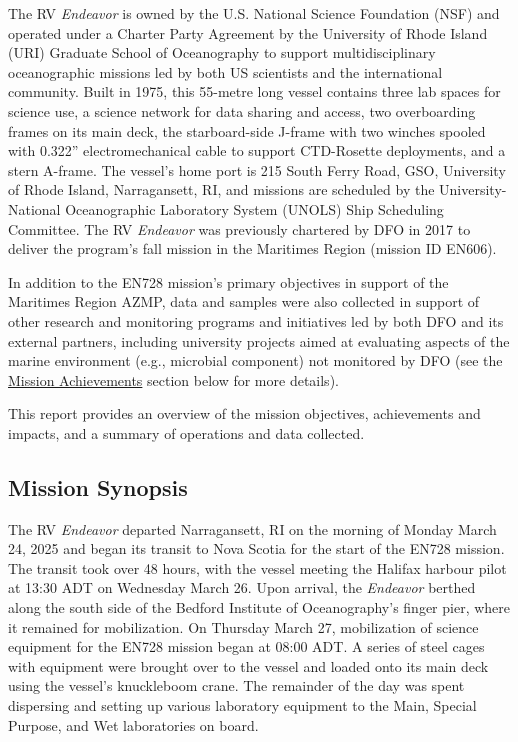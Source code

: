 \documentclass[12pt]{article}\usepackage[]{graphicx}\usepackage[]{color}
\begin{document}
The RV \emph{Endeavor} is owned by the U.S. National Science Foundation (NSF) and operated under a Charter Party Agreement by the University of Rhode Island (URI) Graduate School of Oceanography to support multidisciplinary oceanographic missions led by both US scientists and the international community. Built in 1975, this 55-metre long vessel contains three lab spaces for science use, a science network for data sharing and access, two overboarding frames on its main deck, the starboard-side J-frame with two winches spooled with 0.322'' electromechanical cable to support CTD-Rosette deployments, and a stern A-frame. The vessel's home port is 215 South Ferry Road, GSO, University of Rhode Island, Narragansett, RI, and missions are scheduled by the University-National Oceanographic Laboratory System (UNOLS) Ship Scheduling Committee. The RV \emph{Endeavor} was previously chartered by DFO in 2017 to deliver the program's fall mission in the Maritimes Region (mission ID EN606).

In addition to the EN728 mission's primary objectives in support of the Maritimes Region AZMP, data and samples were also collected in support of other research and monitoring programs and initiatives led by both DFO and its external partners, including university projects aimed at evaluating aspects of the marine environment (e.g., microbial component) not monitored by DFO (see the \hyperref[mission-achievements]{Mission Achievements} section below for more details).

This report provides an overview of the mission objectives, achievements and impacts, and a summary of operations and data collected.

\subsection{Mission Synopsis}\label{mission-synopsis}

The RV \emph{Endeavor} departed Narragansett, RI on the morning of Monday March 24, 2025 and began its transit to Nova Scotia for the start of the EN728 mission. The transit took over 48 hours, with the vessel meeting the Halifax harbour pilot at 13:30 ADT on Wednesday March 26. Upon arrival, the \emph{Endeavor} berthed along the south side of the Bedford Institute of Oceanography's finger pier, where it remained for mobilization. On Thursday March 27, mobilization of science equipment for the EN728 mission began at 08:00 ADT. A series of steel cages with equipment were brought over to the vessel and loaded onto its main deck using the vessel's knuckleboom crane. The remainder of the day was spent dispersing and setting up various laboratory equipment to the Main, Special Purpose, and Wet laboratories on board.
\end{document}
